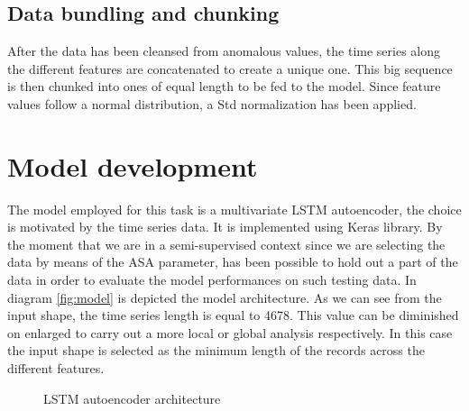 \documentclass{article}
\begin{document}
\begin{multicols*}{2}
\subsection{Data bundling and chunking}
After the data has been cleansed from anomalous values, the time series along the different features are concatenated to create a unique one. This big sequence is then chunked into ones of equal length to be fed to the model.
Since feature values follow a normal distribution, a Std normalization has been applied.

\section{Model development}
\label{model_development}
The model employed for this task is a multivariate LSTM autoencoder, the choice is motivated by the time series data. It is implemented using Keras library.
By the moment that we are in a semi-supervised context since we are selecting the data by means of the ASA parameter, has been possible to hold out a part of the data in order to evaluate the model performances on such testing data.
In diagram \ref{fig:model} is depicted the model architecture. As we can see from the input shape, the time series length is equal to 4678. This value can be diminished on enlarged to carry out a more local or global analysis respectively. In this case the input shape is selected as the minimum length of the records across the different features.

\begin{figure}[H]
	\centering
	\caption{LSTM autoencoder architecture}
\end{figure}


\end{multicols*}
\end{document}
